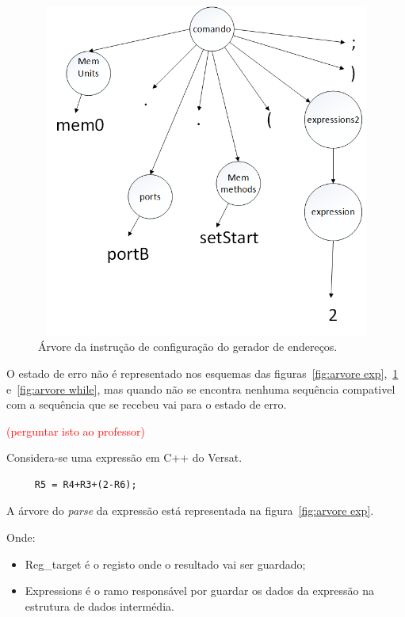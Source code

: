 \begin{figure}[!htb]
  \centering
  \includegraphics[height=110mm, width=120mm]{Figures/parse_do_mem0.png}
  \caption[Árvore da instrução de configuração do gerador de endereços.]{Árvore da instrução de configuração do gerador de endereços.}  
  \label{fig:arvore mem0}
\end{figure}

\pagebreak

O estado de erro não é representado nos esquemas das figuras~\ref{fig:arvore exp},~\ref{fig:arvore mem0} e~\ref{fig:arvore while}, mas quando não se encontra nenhuma sequência compativel
com a sequência que se recebeu vai para o estado de erro. 

\textcolor{red}{(perguntar isto ao professor)}

Considera-se uma expressão em C++ do Versat.

\begin{lstlisting} 
     R5 = R4+R3+(2-R6);   
\end{lstlisting}  

A árvore do {\it parse} da expressão está representada na figura~\ref{fig:arvore exp}.

Onde:

\begin{itemize}
  \item Reg\_target é o registo onde o resultado vai ser guardado;
  \item Expressions é o ramo responsável por guardar os dados da expressão na estrutura de dados intermédia.
\end{itemize}

